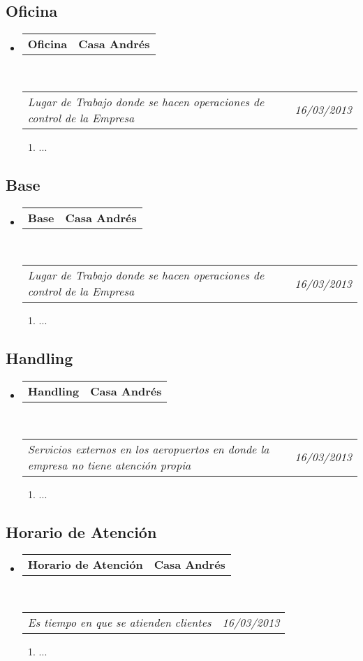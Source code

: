 \documentclass[10pt,letterpaper]{article}
\makeatletter
\newcommand{\headerrow}[2]
{\begin{tabular*}{\linewidth}{l@{\extracolsep{\fill}}r}
	#1 &
	#2 \\
\end{tabular*}}
\makeatother
\begin{document}
\subsection*{Oficina}

\begin{itemize}
	\parskip=0.1em

	\item
	\headerrow
		{\textbf{Oficina}}
		{\textbf{Casa Andrés}}
	\\
	\headerrow
		{\emph{Lugar de Trabajo donde se hacen operaciones de control de la Empresa}}
		{\emph{16/03/2013}}
	\begin{enumerate}
		\item ...
	\end{enumerate}

\end{itemize}

\subsection*{Base}

\begin{itemize}
	\parskip=0.1em

	\item
	\headerrow
		{\textbf{Base}}
		{\textbf{Casa Andrés}}
	\\
	\headerrow
		{\emph{Lugar de Trabajo donde se hacen operaciones de control de la Empresa}}
		{\emph{16/03/2013}}
	\begin{enumerate}
		\item ...
	\end{enumerate}

\end{itemize}

\subsection*{Handling}

\begin{itemize}
	\parskip=0.1em

	\item
	\headerrow
		{\textbf{Handling}}
		{\textbf{Casa Andrés}}
	\\
	\headerrow
		{\emph{Servicios externos en los aeropuertos en donde la empresa no tiene atención propia}}
		{\emph{16/03/2013}}
	\begin{enumerate}
		\item ...
	\end{enumerate}

\end{itemize}

\subsection*{Horario de Atención}

\begin{itemize}
	\parskip=0.1em

	\item
	\headerrow
		{\textbf{Horario de Atención}}
		{\textbf{Casa Andrés}}
	\\
	\headerrow
		{\emph{Es tiempo en que se atienden clientes}}
		{\emph{16/03/2013}}
	\begin{enumerate}
		\item ...
	\end{enumerate}

\end{itemize}
	
\end{document}
